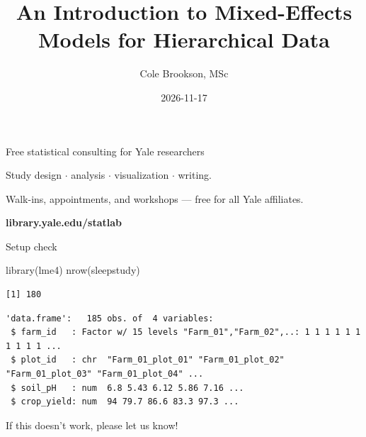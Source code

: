 \documentclass[
  ignorenonframetext,
  aspectratio=169,
]{beamer}
\title{An Introduction to Mixed-Effects Models for Hierarchical Data}
\author{Cole Brookson, MSc}
\date{2026-11-17}
\newenvironment{Shaded}{\begin{snugshade}}{\end{snugshade}}
\newcommand{\FunctionTok}[1]{\textcolor[rgb]{0.28,0.35,0.67}{#1}}
\newcommand{\NormalTok}[1]{\textcolor[rgb]{0.00,0.23,0.31}{#1}}
\newcommand{\OtherTok}[1]{\textcolor[rgb]{0.00,0.23,0.31}{#1}}
\newcommand{\SpecialCharTok}[1]{\textcolor[rgb]{0.37,0.37,0.37}{#1}}
\newcommand{\StringTok}[1]{\textcolor[rgb]{0.13,0.47,0.30}{#1}}
\begin{document}
\frame{\titlepage}

\begin{frame}{Free statistical consulting for Yale researchers}
\label{free-statistical-consulting-for-yale-researchers}
\vspace{2.8em}

\begin{center}

\large
Study design $\cdot$ analysis $\cdot$ visualization $\cdot$ writing.

\vspace{1.4em}

\normalsize
Walk-ins, appointments, and workshops --- free for all Yale affiliates.

\vspace{2.8em}

\textcolor{statsecondary}{%
  \large\textbf{library.yale.edu/statlab}%
}


\end{center}
\end{frame}

\begin{frame}[fragile]{Setup check}
\label{setup-check}
\begin{Shaded}
\begin{Highlighting}[]
\FunctionTok{library}\NormalTok{(lme4)}
\FunctionTok{nrow}\NormalTok{(sleepstudy)}
\end{Highlighting}
\end{Shaded}

\begin{verbatim}
[1] 180
\end{verbatim}

\begin{Shaded}
\end{Shaded}

\begin{verbatim}
'data.frame':   185 obs. of  4 variables:
 $ farm_id   : Factor w/ 15 levels "Farm_01","Farm_02",..: 1 1 1 1 1 1 1 1 1 1 ...
 $ plot_id   : chr  "Farm_01_plot_01" "Farm_01_plot_02" "Farm_01_plot_03" "Farm_01_plot_04" ...
 $ soil_pH   : num  6.8 5.43 6.12 5.86 7.16 ...
 $ crop_yield: num  94 79.7 86.6 83.3 97.3 ...
\end{verbatim}

If this doesn't work, please let us know!
\end{frame}
\end{document}
